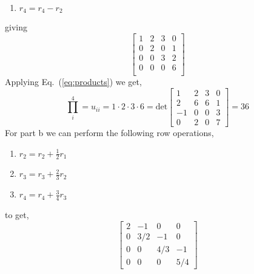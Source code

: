 \begin{enumerate}[label=\arabic*.]
\begin{mdframed}[style=MyFrame]
\begin{enumerate}
                \item $r_{4} = r_{4} - r_{2}$
            \end{enumerate}
            giving
            \begin{equation}
                \begin{bmatrix}
                    1   &   2   &   3   &   0   \\
                    0   &   2   &   0   &   1   \\
                    0   &   0   &   3   &   2   \\
                    0   &   0   &   0   &   6   \\
                \end{bmatrix}
            \end{equation}
            Applying Eq.~(\ref{eq:products}) we get,
            \begin{equation}
                \prod_{i}^{4} = u_{ii}
                =
                1 \cdot 2 \cdot 3 \cdot 6
                =
                \text{det}
                \begin{bmatrix}
                    1   &   2   &   3   &   0   \\
                    2   &   6   &   6   &   1   \\
                    -1  &   0   &   0   &   3   \\
                    0   &   2   &   0   &   7
                \end{bmatrix}
                =
                36
            \end{equation}
            For part b we can perform the following row operations,
            \begin{enumerate}
                \item $r_{2} = r_{2} + \frac{1}{2}r_{1}$
                \item $r_{3} = r_{3} + \frac{2}{3}r_{2}$
                \item $r_{4} = r_{4} + \frac{3}{4}r_{3}$
            \end{enumerate}
            to get,
            \begin{equation}
                \begin{bmatrix}
                    2   &   -1      &   0   &   0   \\
                    0   &   3/2     &   -1  &   0   \\
                    0   &   0       &   4/3 &   -1  \\
                    0   &   0       &   0   &   5/4

\end{bmatrix}
\end{equation}
\end{mdframed}
\end{enumerate}
